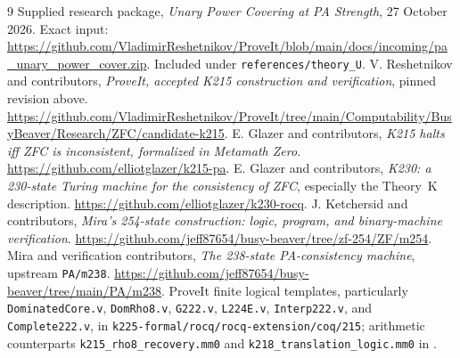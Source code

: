 \documentclass[11pt]{article}
\theoremstyle{definition}\newtheorem{definition}[theorem]{Definition}
\begin{document}
\begin{thebibliography}{9}
 Supplied research package, \emph{Unary Power Covering at PA
Strength}, 27 October 2026. Exact input:
\url{https://github.com/VladimirReshetnikov/ProveIt/blob/main/docs/incoming/pa_unary_power_cover.zip}.
Included under \texttt{references/theory\_U}.
 V. Reshetnikov and contributors, \emph{ProveIt, accepted
K215 construction and verification}, pinned revision above.
\url{https://github.com/VladimirReshetnikov/ProveIt/tree/main/Computability/BusyBeaver/Research/ZFC/candidate-k215}.
 E. Glazer and contributors, \emph{K215 halts iff ZFC is
inconsistent, formalized in Metamath Zero}.
\url{https://github.com/elliotglazer/k215-pa}.
 E. Glazer and contributors, \emph{K230: a 230-state Turing
machine for the consistency of ZFC}, especially the Theory~K description.
\url{https://github.com/elliotglazer/k230-rocq}.
 J. Ketchersid and contributors, \emph{Mira's 254-state
construction: logic, program, and binary-machine verification}.
\url{https://github.com/jeff87654/busy-beaver/tree/zf-254/ZF/m254}.
 Mira and verification contributors, \emph{The 238-state
PA-consistency machine}, upstream \texttt{PA/m238}.
\url{https://github.com/jeff87654/busy-beaver/tree/main/PA/m238}.
 ProveIt finite logical templates, particularly
\texttt{DominatedCore.v}, \texttt{DomRho8.v}, \texttt{G222.v},
\texttt{L224E.v}, \texttt{Interp222.v}, and \texttt{Complete222.v}, in
\texttt{k225-formal/rocq/rocq-extension/coq/215}; arithmetic counterparts
\texttt{k215\_rho8\_recovery.mm0} and
\texttt{k218\_translation\_logic.mm0} in \cite{k215pa}.
\end{thebibliography}
\end{document}
